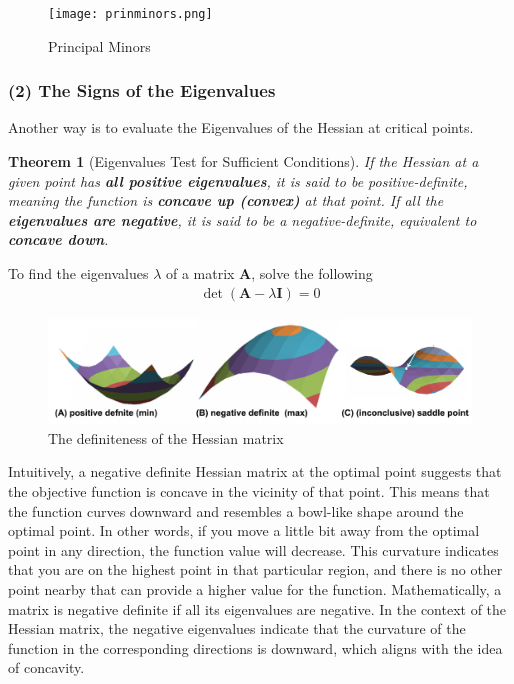 \documentclass[11pt,a4paper]{book}
\newtheorem{theorem}{Theorem}[section]
\theoremstyle{definition}\newtheorem{definition}{Definition}
\theoremstyle{definition}\newtheorem{fact}{Fact}
\theoremstyle{definition}\newtheorem{remark}{Remark}
\theoremstyle{definition}\newtheorem{ex}{Ex.}
\theoremstyle{definition}\newtheorem{project}{Project}
\theoremstyle{definition}\newtheorem{problem}{Problem}
\theoremstyle{definition}\newtheorem{example}{Example}
\newenvironment{ftheorem}
{\begin{mdframed}\begin{theorem}}
		{\end{theorem}\end{mdframed}}
\numberwithin{theorem}{section}
\numberwithin{corollary}{chapter}
\numberwithin{assumption}{chapter}
\numberwithin{definition}{chapter}
\numberwithin{prop}{chapter}
\numberwithin{notation}{chapter}
\numberwithin{problem}{chapter}
\numberwithin{example}{chapter}
\numberwithin{fact}{chapter}
\numberwithin{ex}{chapter}
\def\A{\mathbf A}
\def\I{\mathbf I}
\begin{document}
	\begin{figure}[ht]
		\centering
		\texttt{[image: prinminors.png]}
		\caption{Principal Minors}
	\end{figure}
	
	\subsubsection{(2) The Signs of the Eigenvalues}
	Another way is to evaluate the Eigenvalues of the Hessian at critical points. 
	
	\begin{ftheorem}[Eigenvalues Test for Sufficient Conditions]
		If the Hessian at a given point has \textbf{all positive eigenvalues}, it is said to be positive-definite, meaning the function is \textbf{concave up (convex)} at that point. If all the \textbf{eigenvalues are negative}, it is said to be a negative-definite, equivalent to \textbf{concave down}.
	\end{ftheorem}
	
	To find the eigenvalues $\lambda$ of a matrix $\A$, solve the following
	\begin{align*}
		 \det (\A - \lambda \I) = 0      
	\end{align*}
	
	\begin{figure}[ht]
		\centering
		\includegraphics{figs/hessian.png}
		\caption{The definiteness of the Hessian matrix}
	\end{figure}
	
	Intuitively, a negative definite Hessian matrix at the optimal point suggests that the objective function is concave in the vicinity of that point. This means that the function curves downward and resembles a bowl-like shape around the optimal point. In other words, if you move a little bit away from the optimal point in any direction, the function value will decrease. This curvature indicates that you are on the highest point in that particular region, and there is no other point nearby that can provide a higher value for the function. Mathematically, a matrix is negative definite if all its eigenvalues are negative. In the context of the Hessian matrix, the negative eigenvalues indicate that the curvature of the function in the corresponding directions is downward, which aligns with the idea of concavity.
	
\end{document}
